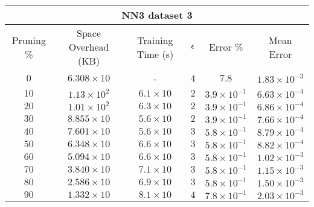 \begin{adjustwidth}{0cm}{}
\begin{tabular}{cccccc}
\hline
\multicolumn{6}{c}{NN3 dataset 3} \\
\toprule
Pruning \% & Space Overhead (KB) & Training Time (s) & $\epsilon$ & Error \% & Mean Error\\
\midrule
$0$ & $6.308 \times 10$ & - & $4$ & $7.8$ & $1.83 \times 10^{-3}$\\
$10$ & $1.13 \times 10^2 $ & $6.1 \times 10$ & $2$ & $3.9 \times 10^{-1}$ & $6.63 \times 10^{-4}$\\
$20$ & $1.01 \times 10^2 $ & $6.3 \times 10$ & $2$ & $3.9 \times 10^{-1}$ & $6.86 \times 10^{-4}$\\
$30$ & $8.855 \times 10$ & $5.6 \times 10$ & $2$ & $3.9 \times 10^{-1}$ & $7.66 \times 10^{-4}$\\
$40$ & $7.601 \times 10$ & $5.6 \times 10$ & $3$ & $5.8 \times 10^{-1}$ & $8.79 \times 10^{-4}$\\
$50$ & $6.348 \times 10$ & $6.6 \times 10$ & $3$ & $5.8 \times 10^{-1}$ & $8.82 \times 10^{-4}$\\
$60$ & $5.094 \times 10$ & $6.6 \times 10$ & $3$ & $5.8 \times 10^{-1}$ & $1.02 \times 10^{-3}$\\
$70$ & $3.840 \times 10$ & $7.1 \times 10$ & $3$ & $5.8 \times 10^{-1}$ & $1.15 \times 10^{-3}$\\
$80$ & $2.586 \times 10$ & $6.9 \times 10$ & $3$ & $5.8 \times 10^{-1}$ & $1.50 \times 10^{-3}$\\
$90$ & $1.332 \times 10$ & $8.1 \times 10$ & $4$ & $7.8 \times 10^{-1}$ & $2.03 \times 10^{-3}$\\
\bottomrule
\end{tabular}
\end{adjustwidth}

\null\par\null


